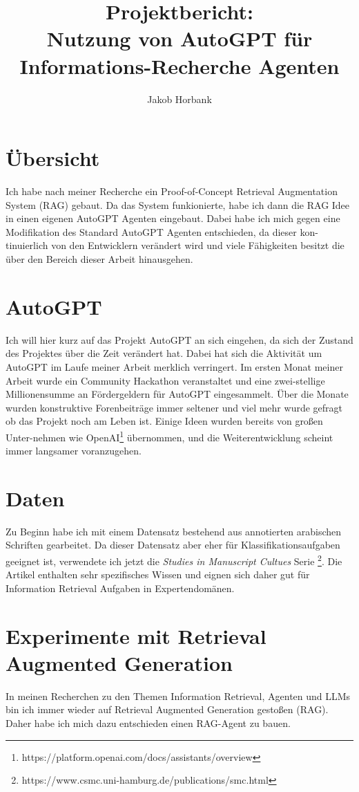 \documentclass{report}
\title{Projektbericht:\\Nutzung von AutoGPT für Informations-Recherche Agenten}
\author{Jakob Horbank}
\begin{document}
\maketitle

\section*{Übersicht}

Ich habe nach meiner Recherche ein Proof-of-Concept Retrieval Augmentation System (RAG) gebaut.
Da das System funkionierte, habe ich dann die RAG Idee in einen eigenen AutoGPT Agenten eingebaut.
Dabei habe ich mich gegen eine Modifikation des Standard AutoGPT Agenten entschieden, da dieser kon-tinuierlich von den Entwicklern verändert wird und viele Fähigkeiten besitzt die über den Bereich dieser Arbeit hinausgehen.

\section*{AutoGPT}

Ich will hier kurz auf das Projekt AutoGPT an sich eingehen, da sich der Zustand des Projektes über die Zeit verändert hat.
Dabei hat sich die Aktivität um AutoGPT im Laufe meiner Arbeit merklich verringert.
Im ersten Monat meiner Arbeit wurde ein Community Hackathon veranstaltet und eine zwei-stellige Millionensumme an Fördergeldern für AutoGPT eingesammelt.
Über die Monate wurden konstruktive Forenbeiträge immer seltener und viel mehr wurde gefragt ob das Projekt noch am Leben ist.
Einige Ideen wurden bereits von großen Unter-nehmen wie OpenAI\footnote{https://platform.openai.com/docs/assistants/overview} übernommen, und die Weiterentwicklung scheint immer langsamer voranzugehen.

\section*{Daten}

Zu Beginn habe ich mit einem Datensatz bestehend aus annotierten arabischen Schriften gearbeitet.
Da dieser Datensatz aber eher für Klassifikationsaufgaben geeignet ist, verwendete ich jetzt die \textit{Studies in Manuscript Cultues} Serie \footnote{https://www.csmc.uni-hamburg.de/publications/smc.html}.
Die Artikel enthalten sehr spezifisches Wissen und eignen sich daher gut für Information Retrieval Aufgaben in Expertendomänen.

\section*{Experimente mit Retrieval Augmented Generation}
In meinen Recherchen zu den Themen Information Retrieval, Agenten und LLMs bin ich immer wieder auf Retrieval Augmented Generation gestoßen (RAG).
Daher habe ich mich dazu entschieden einen RAG-Agent zu bauen.
\end{document}
